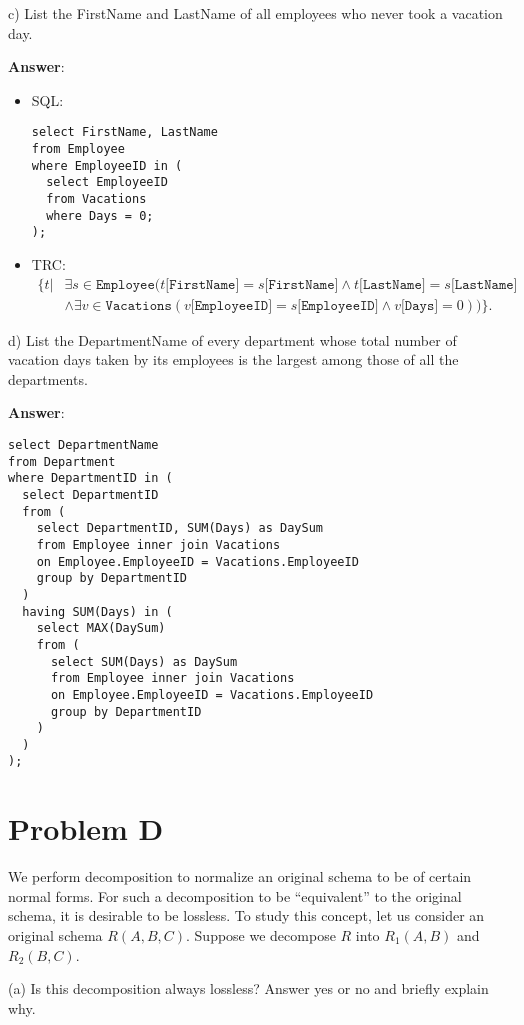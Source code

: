 \documentclass{article}
\begin{document}
c) List the FirstName and LastName of all employees who never took a vacation day.

{\bf Answer}:
\begin{itemize}
\item SQL:
\begin{verbatim}
select FirstName, LastName
from Employee
where EmployeeID in (
  select EmployeeID
  from Vacations
  where Days = 0;
);
\end{verbatim}

\item TRC:
$$\begin{aligned}
\{t | & \exists s \in \texttt{Employee} (t\texttt{[FirstName]} = s\texttt{[FirstName]} \wedge t\texttt{[LastName]} = s\texttt{[LastName]}\\
& \wedge \exists v \in \texttt{Vacations} (v\texttt{[EmployeeID]} = s\texttt{[EmployeeID]} 
\wedge v\texttt{[Days]} = 0))\}.
\end{aligned}$$
\end{itemize}

d) List the DepartmentName of every department whose total number of vacation days taken by its employees is the largest among those of all the departments.

{\bf Answer}:
\begin{verbatim}
select DepartmentName
from Department
where DepartmentID in (
  select DepartmentID
  from (
    select DepartmentID, SUM(Days) as DaySum
    from Employee inner join Vacations
    on Employee.EmployeeID = Vacations.EmployeeID
    group by DepartmentID
  )
  having SUM(Days) in (
    select MAX(DaySum)
    from (
      select SUM(Days) as DaySum
      from Employee inner join Vacations
      on Employee.EmployeeID = Vacations.EmployeeID
      group by DepartmentID
    )
  )
);
\end{verbatim}

\section{Problem D}
We perform decomposition to normalize an original schema to be of certain normal forms. For such a decomposition to be ``equivalent'' to the original schema, it is desirable to be lossless. To study this concept, let us consider an original schema $R(A, B, C)$. Suppose we decompose $R$ into $R_1 (A, B)$ and $R_2 (B, C)$.

(a) Is this decomposition always lossless? Answer yes or no and briefly explain why.
\end{document}

